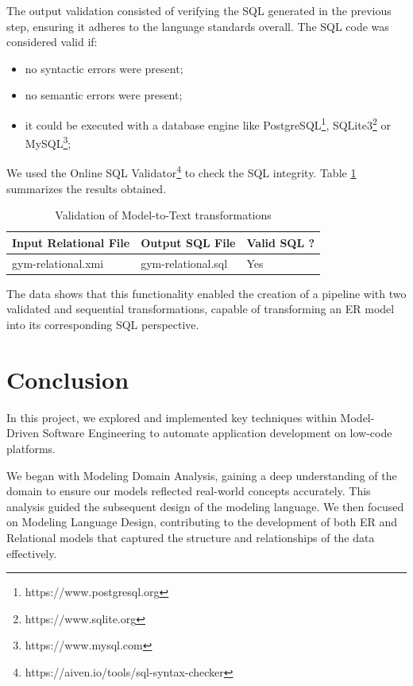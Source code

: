 \documentclass[10pt]{article}
\begin{document}
The output validation consisted of verifying the SQL generated in the previous step, ensuring it adheres to the language standards overall. The SQL code was considered valid if:

\begin{itemize}

    \item no syntactic errors were present;
    
    \item no semantic errors were present;
    
    \item it could be executed with a database engine like PostgreSQL\footnote{https://www.postgresql.org},  SQLite3\footnote{https://www.sqlite.org} or MySQL\footnote{https://www.mysql.com};
    
\end{itemize}

We used the Online SQL Validator\footnote{https://aiven.io/tools/sql-syntax-checker} to check the SQL integrity. Table \ref{sql-validation} summarizes the results obtained.

\begin{table}[H]
\centering
\begin{tabularx}{\textwidth}{|>{\centering\arraybackslash}X|>{\centering\arraybackslash}X|>{\centering\arraybackslash}p{3.5cm}|}
\hline
\textbf{Input Relational File} & \textbf{Output SQL File} & \textbf{Valid SQL ?} \\ \hline
gym-relational.xmi & gym-relational.sql & Yes \\ \hline
\end{tabularx}
\caption{Validation of Model-to-Text transformations}
\label{sql-validation}
\end{table}

The data shows that this functionality enabled the creation of a pipeline with two validated and sequential transformations, capable of transforming an ER model into its corresponding SQL perspective.

\section{Conclusion}

In this project, we explored and implemented key techniques within Model-Driven Software Engineering to automate application development on low-code platforms. 

We began with Modeling Domain Analysis, gaining a deep understanding of the domain to ensure our models reflected real-world concepts accurately. This analysis guided the subsequent design of the modeling language. We then focused on Modeling Language Design, contributing to the development of both ER and Relational models that captured the structure and relationships of the data effectively.
\end{document}
